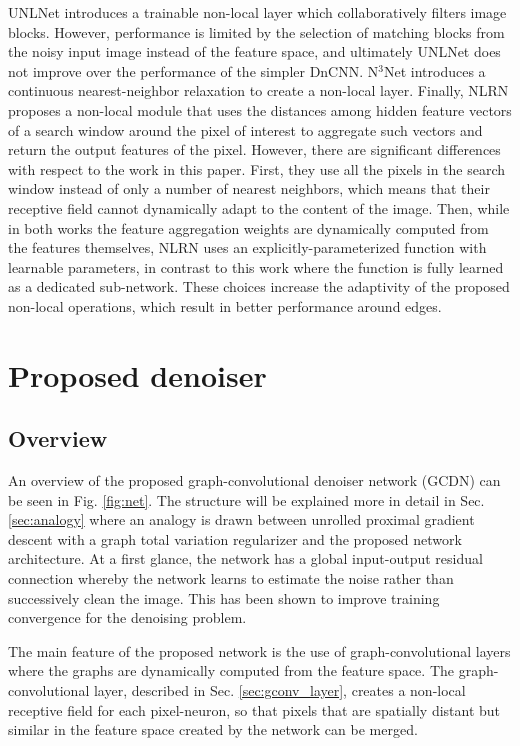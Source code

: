 \documentclass[journal]{IEEEtran}
\begin{document}
UNLNet \cite{lefkimmiatis2018universal} introduces a trainable non-local layer which collaboratively filters image blocks. However, performance is limited by the selection of matching blocks from the noisy input image instead of the feature space, and ultimately UNLNet does not improve over the performance of the simpler DnCNN. N$^3$Net \cite{plotz2018neural} introduces a continuous nearest-neighbor relaxation to create a non-local layer. Finally, NLRN \cite{liu2018non} proposes a non-local module that uses the distances among hidden feature vectors of a search window around the pixel of interest to aggregate such vectors and return the output features of the pixel. However, there are significant differences with respect to the work in this paper. First, they use all the pixels in the search window instead of only a number of nearest neighbors, which means that their receptive field cannot dynamically adapt to the content of the image. Then, while in both works the feature aggregation weights are dynamically computed from the features themselves, NLRN uses an explicitly-parameterized function with learnable parameters, in contrast to this work where the function is fully learned as a dedicated sub-network. These choices increase the adaptivity of the proposed non-local operations, which result in better performance around edges.


\section{Proposed denoiser}\label{sec:method}


\subsection{Overview} \label{sec:overview}

An overview of the proposed graph-convolutional denoiser network (GCDN) can be seen in Fig. \ref{fig:net}. The structure will be explained more in detail in Sec. \ref{sec:analogy} where an analogy is drawn between unrolled proximal gradient descent with a graph total variation regularizer and the proposed network architecture. At a first glance, the network has a global input-output residual connection whereby the network learns to estimate the noise rather than successively clean the image. This has been shown \cite{zhang2017beyond} to improve training convergence for the denoising problem. 

The main feature of the proposed network is the use of graph-convolutional layers where the graphs are dynamically computed from the feature space. The graph-convolutional layer, described in Sec. \ref{sec:gconv_layer}, creates a non-local receptive field for each pixel-neuron, so that pixels that are spatially distant but similar in the feature space created by the network can be merged. 
\end{document}
